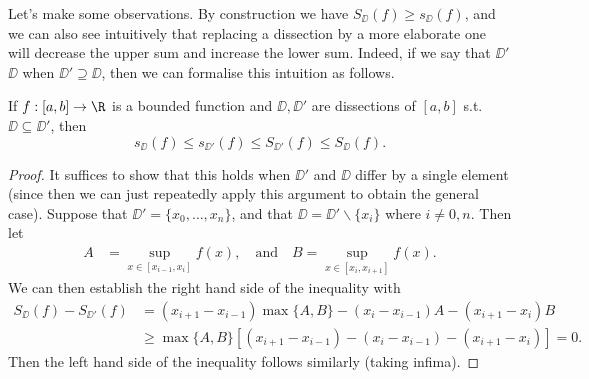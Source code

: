 \begin{center}

\end{center}

Let's make some observations. By construction we have $S_\DD (f) \geq s_\DD(f)$, and we can also see intuitively that replacing a dissection by a more elaborate one will decrease the upper sum and increase the lower sum. Indeed, if we say that $\DD'$  $\DD$ when $\DD' \supseteq \DD$, then we can formalise this intuition as follows.

\begin{lemma}
	If $f: [a, b] \rightarrow \R$ is a bounded function and $\DD, \DD'$ are dissections of $[a, b]$ s.t. $\DD \subseteq \DD'$, then 
	$$s_\DD(f) \leq s_{\DD'}(f) \leq S_{\DD'}(f) \leq S_{\DD}(f).$$
\end{lemma}
\begin{proof}
	It suffices to show that this holds when $\DD'$ and $\DD$ differ by a single element (since then we can just repeatedly apply this argument to obtain the general case).
	Suppose that $\DD' = \{x_0, \dots, x_n\}$, and that $\DD = \DD' \backslash \{x_i\}$ where $i \neq 0, n$. Then let
	\begin{align*}
		A &= \sup_{x \in [x_{i - 1}, x_i]} f(x), \quad \text{and} \quad B = \sup_{x \in [x_{i}, x_{i+1}]} f(x).
	\end{align*}
	We can then establish the right hand side of the inequality with
	\begin{align*}
		S_{\DD}(f) - S_{\DD'}(f) &= (x_{i+1} - x_{i-1})\max\{A, B\} - (x_{i} - x_{i - 1})A - (x_{i + 1} - x_i)B \\
		&\geq \max\{A, B\}[(x_{i+1} - x_{i-1}) - (x_{i} - x_{i - 1}) - (x_{i + 1} - x_i)] = 0.
	\end{align*}
	Then the left hand side of the inequality follows similarly (taking infima).
\end{proof}

